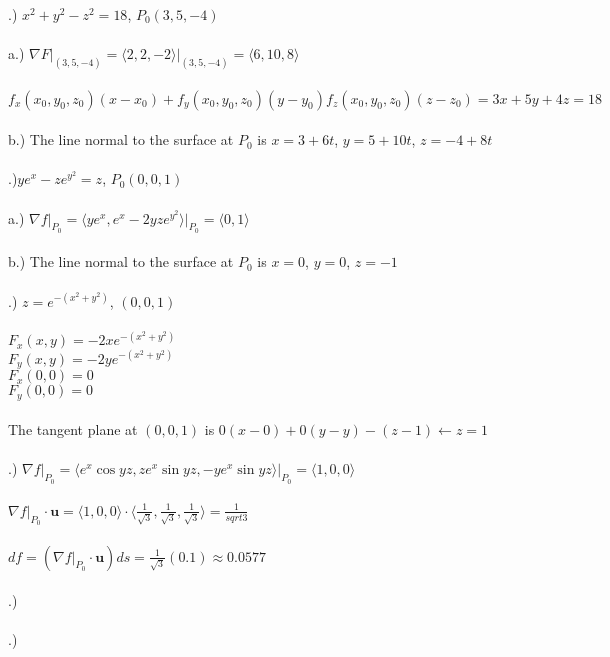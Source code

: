 \documentclass[12pt]{article}
\begin{document}
.) $x^{2} + y^{2} - z^{2} = 18$, \hspace{10pt} $P_{0}(3, 5, -4)$\\\\
\noindent a.) $\nabla F \Big|_{(3, 5, -4)}= \langle 2,2, -2\rangle \Big|_{(3, 5, -4)} = \langle 6, 10, 8\rangle$\\\\
\noindent $f_{x}(x_{0}, y_{0}, z_{0})(x-x_{0}) + f_{y}(x_{0}, y_{0}, z_{0})(y-y_{0}) f_{z}(x_{0}, y_{0}, z_{0})(z - z_{0})= 3x + 5y + 4z = 18$\\\\
\noindent b.) The line normal to the surface at $P_{0}$ is $x = 3 + 6t$, \hspace{10pt} $y = 5 + 10t$, \hspace{10pt} $z = -4 + 8t$\\\\
.)$ye^{x} -ze^{y^{2}} = z$, \hspace{10pt} $P_{0}(0, 0, 1)$\\\\
\noindent a.) $\nabla f \Big|_{P_{0}} = \langle ye^{x}, e^{x} - 2yze^{y^{2}} \rangle \Big|_{P_{0}} = \langle0, 1 \rangle$\\\\
\noindent b.) The line normal to the surface at $P_{0}$ is $x = 0$, \hspace{10pt} $y = 0$, \hspace{10pt} $z = -1$\\\\
.) $z = e^{-(x^{2} + y^{2})}$, \hspace{10pt} $(0, 0, 1)$\\\\
\noindent $F_{x} (x, y) = -2xe^{-(x^{2} + y^{2})}$\\
\noindent $F_{y} (x, y) = -2ye^{-(x^{2} + y^{2})}$\\
\noindent $F_{x}(0,0) = 0$\\
\noindent $F_{y}(0,0) = 0$\\\\
\noindent The tangent plane at $(0,0,1)$ is $0(x-0) + 0(y-y) - (z -1) \leftarrow z = 1$\\\\
.) $\nabla f \Big|_{P_{0}} = \langle e^{x}\cos{yz}, ze^{x}\sin{yz}, -ye^{x}\sin{yz} \rangle \Big|_{P_{0}} = \langle 1, 0, 0\rangle$\\\\
\noindent $\nabla f \Big|_{P_{0}} \cdot \mathbf{u} = \langle 1, 0, 0\rangle \cdot \langle \frac{1}{\sqrt{3}}, \frac{1}{\sqrt{3}}, \frac{1}{\sqrt{3}}\rangle  = \frac{1}{sqrt{3}}$ \\\\


$df  = (\nabla f\Big|_{P_{0}} \cdot \mathbf{u})ds = \frac{1}{\sqrt{3}}(0.1) \approx 0.0577$\\\\
.) $$\\\\
.)
\end{document}
